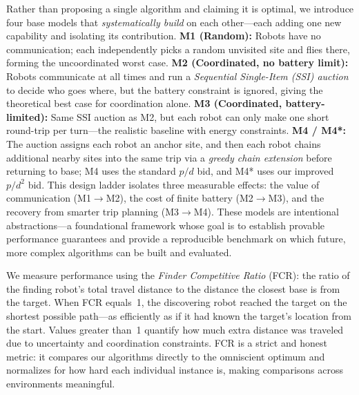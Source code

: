 \documentclass[conference]{IEEEtran}
\begin{document}
Rather than proposing a single algorithm and claiming it is optimal,
we introduce four base models that \emph{systematically build} on each
other---each adding one new capability and isolating its contribution.
\textbf{M1 (Random):} Robots have no communication; each independently
picks a random unvisited site and flies there, forming the uncoordinated
worst case.
\textbf{M2 (Coordinated, no battery limit):} Robots communicate at all
times and run a \emph{Sequential Single-Item (SSI) auction} to decide who
goes where, but the battery constraint is ignored, giving the theoretical
best case for coordination alone.
\textbf{M3 (Coordinated, battery-limited):} Same SSI auction as M2, but
each robot can only make one short round-trip per turn---the realistic
baseline with energy constraints.
\textbf{M4 / M4*:} The auction assigns each robot an anchor site, and
then each robot chains additional nearby sites into the same trip via a
\emph{greedy chain extension} before returning to base; M4 uses the
standard $p/d$ bid, and M4* uses our improved $p/d^2$ bid.
This design ladder isolates three measurable effects:
the value of communication (M1$\to$M2),
the cost of finite battery (M2$\to$M3),
and the recovery from smarter trip planning (M3$\to$M4).
These models are intentional abstractions---a foundational framework whose
goal is to establish provable performance guarantees and provide a
reproducible benchmark on which future, more complex algorithms can be
built and evaluated.

We measure performance using the \emph{Finder Competitive Ratio} (FCR):
the ratio of the finding robot's total travel distance to the distance
the closest base is from the target.
When FCR equals~1, the discovering robot reached the target on the
shortest possible path---as efficiently as if it had known the target's
location from the start.
Values greater than~1 quantify how much extra distance was traveled due
to uncertainty and coordination constraints.
FCR is a strict and honest metric: it compares our algorithms directly
to the omniscient optimum and normalizes for how hard each individual
instance is, making comparisons across environments meaningful.
\end{document}
